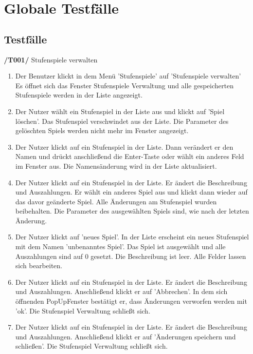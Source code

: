 
\section{Globale Testfälle}

\subsection{Testfälle}

\textbf{/T001/} Stufenspiele verwalten
\begin{enumerate}

\item {}
{Der Benutzer klickt in dem Menü 'Stufenspiele' auf 'Stufenspiele verwalten'}
{Es öffnet sich das Fenster Stufenspiele Verwaltung und alle gespeicherten Stufenspiele werden in der Liste angezeigt.}

\item {}
{Der Nutzer wählt ein Stufenspiel in der Liste aus und klickt auf 'Spiel löschen'.}
{Das Stufenspiel verschwindet aus der Liste. Die Parameter des gelöschten Spiels werden nicht mehr im Fenster angezeigt.}

\item {}
{Der Nutzer klickt auf ein Stufenspiel in der Liste. Dann verändert er den Namen und drückt anschließend die Enter-Taste oder wählt ein anderes Feld im Fenster aus.}
{Die Namensänderung wird in der Liste aktualisiert. }

\item {}
{Der Nutzer klickt auf ein Stufenspiel in der Liste. Er ändert die Beschreibung und Auszahlungen. Er wählt ein anderes Spiel aus und klickt dann wieder auf das davor geänderte Spiel.}
{Alle Änderungen am Stufenspiel wurden beibehalten. Die Parameter des ausgewählten Spiels sind, wie nach der letzten Änderung.}

\item {}
{Der Nutzer klickt auf 'neues Spiel'.}
{In der Liste erscheint ein neues Stufenspiel mit dem Namen 'unbenanntes Spiel'. Das Spiel ist ausgewählt und alle Auszahlungen sind auf 0 gesetzt. Die Beschreibung ist leer. Alle Felder lassen sich bearbeiten.}

\item {}
{Der Nutzer klickt auf ein Stufenspiel in der Liste. Er ändert die Beschreibung und Auszahlungen. Anschließend klickt er auf 'Abbrechen'. In dem sich öffnenden PopUpFenster bestätigt er, dass Änderungen verworfen werden mit 'ok'.}
{Die Stufenspiel Verwaltung schließt sich.}

\item {}
{Der Nutzer klickt auf ein Stufenspiel in der Liste. Er ändert die Beschreibung und Auszahlungen. Anschließend klickt er auf 'Änderungen speichern und schließen'.}
{Die Stufenspiel Verwaltung schließt sich.}


\end{enumerate}

